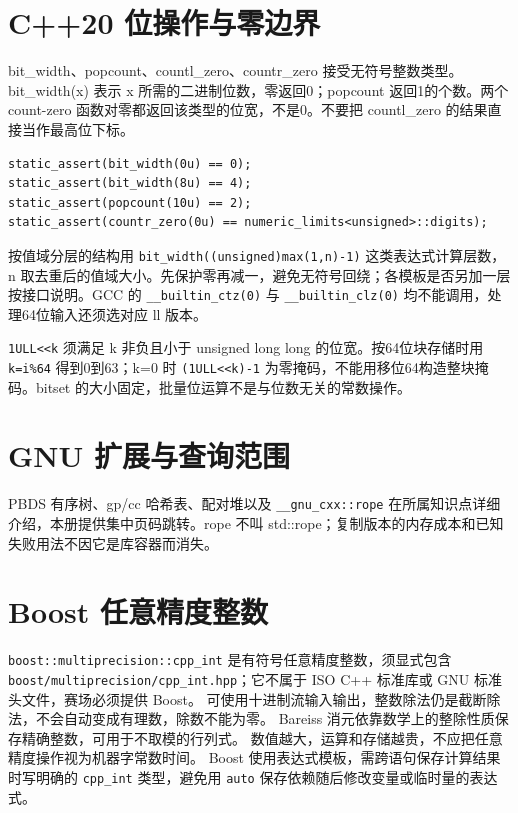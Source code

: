 \section{C++20 位操作与零边界}
bit\_width、popcount、countl\_zero、countr\_zero 接受无符号整数类型。bit\_width(x) 表示 x 所需的二进制位数，零返回0；popcount 返回1的个数。两个 count-zero 函数对零都返回该类型的位宽，不是0。不要把 countl\_zero 的结果直接当作最高位下标。
\begin{lstlisting}
static_assert(bit_width(0u) == 0);
static_assert(bit_width(8u) == 4);
static_assert(popcount(10u) == 2);
static_assert(countr_zero(0u) == numeric_limits<unsigned>::digits);
\end{lstlisting}
按值域分层的结构用 \texttt{bit\_width((unsigned)max(1,n)-1)} 这类表达式计算层数，n 取去重后的值域大小。先保护零再减一，避免无符号回绕；各模板是否另加一层按接口说明。GCC 的 \texttt{\_\_builtin\_ctz(0)} 与 \texttt{\_\_builtin\_clz(0)} 均不能调用，处理64位输入还须选对应 ll 版本。

\texttt{1ULL<<k} 须满足 k 非负且小于 unsigned long long 的位宽。按64位块存储时用 \texttt{k=i\%64} 得到0到63；k=0 时 \texttt{(1ULL<<k)-1} 为零掩码，不能用移位64构造整块掩码。bitset 的大小固定，批量位运算不是与位数无关的常数操作。



\section{GNU 扩展与查询范围}
PBDS 有序树、gp/cc 哈希表、配对堆以及 \texttt{\_\_gnu\_cxx::rope} 在所属知识点详细介绍，本册提供集中页码跳转。rope 不叫 std::rope；复制版本的内存成本和已知失败用法不因它是库容器而消失。


\section{Boost 任意精度整数}
\texttt{boost::multiprecision::cpp\_int} 是有符号任意精度整数，须显式包含
\nolinkurl{boost/multiprecision/cpp_int.hpp}；它不属于 ISO C++ 标准库或 GNU 标准头文件，赛场必须提供 Boost。
可使用十进制流输入输出，整数除法仍是截断除法，不会自动变成有理数，除数不能为零。
Bareiss 消元依靠数学上的整除性质保存精确整数，可用于不取模的行列式。
数值越大，运算和存储越贵，不应把任意精度操作视为机器字常数时间。
Boost 使用表达式模板，需跨语句保存计算结果时写明确的 \texttt{cpp\_int} 类型，避免用 \texttt{auto} 保存依赖随后修改变量或临时量的表达式。






